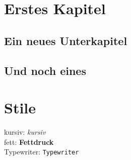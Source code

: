 
\chapter{Erstes Kapitel}
\blindtext

\section{Ein neues Unterkapitel}
\blindtext[5]

\section{Und noch eines}
\blindtext[2]

\chapter{Stile}
kursiv: \textit{kursiv}\\  
fett: \textbf{Fettdruck}\\  
Typewriter: \texttt{Typewriter}  



